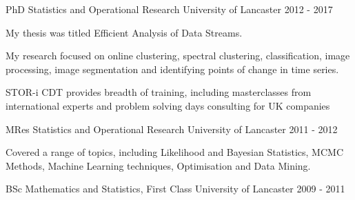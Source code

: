 \begin{cventries}
  \cventry
    {PhD Statistics and Operational Research}
    {University of Lancaster}
    {}
    {2012 - 2017}
    {
      \begin{cvitems}
        \item {My thesis was titled Efficient Analysis of Data Streams.}
        \item {My research focused on online clustering, spectral clustering, classification, image processing, image segmentation and identifying points of change in time series.}
        \item {STOR-i CDT provides breadth of training, including masterclasses from international experts and problem solving days consulting for UK companies}
      \end{cvitems}
    }

    \cventry
    {MRes Statistics and Operational Research}
    {University of Lancaster}
    {}
    {2011 - 2012}
    {
        \begin{cvitems}
        \item {Covered a range of topics, including Likelihood and Bayesian Statistics, MCMC Methods, Machine Learning techniques, Optimisation and Data Mining.}
      \end{cvitems}
     }
    
    \cventry
    {BSc Mathematics and Statistics, First Class}
    {University of Lancaster}
    {}
    {2009 - 2011}
    {}
\end{cventries}
